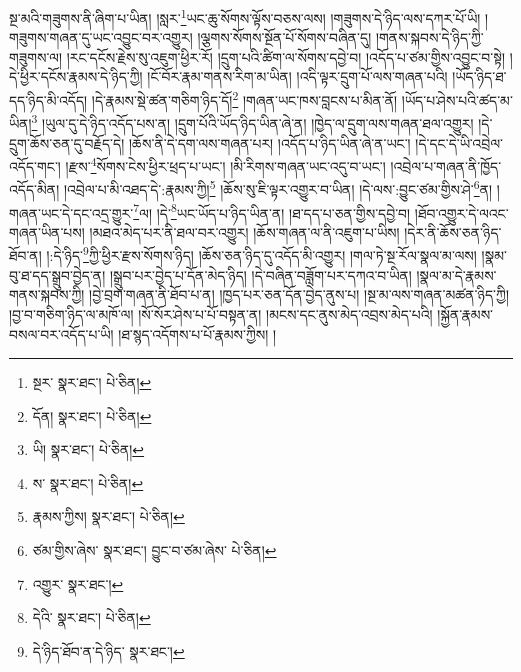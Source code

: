 སྔ་མའི་གཟུགས་ནི་ཞིག་པ་ཡིན། །སླར་\footnote{སྔར་  སྣར་ཐང་།  པེ་ཅིན། }ཡང་ཆུ་སོགས་ལྟོས་བཅས་ལས། །གཟུགས་དེ་ཉིད་ལས་དཀར་པོ་ཡི། །གཟུགས་གཞན་དུ་ཡང་འབྱུང་བར་འགྱུར། །ལྕགས་སོགས་སྔོན་པོ་སོགས་བཞིན་དུ། །གནས་སྐབས་དེ་ཉིད་ཀྱི་གཟུགས་ལ། །རང་དངོས་རྗེས་སུ་འཇུག་ཕྱིར་རོ། །དྲུག་པའི་ཚིག་ལ་སོགས་དབྱེ་བ། །འདོད་པ་ཙམ་གྱིས་འབྱུང་བ་སྟེ། །དེ་ཕྱིར་དངོས་རྣམས་དེ་ཉིད་ཀྱི། །ངོ་བོར་རྣམ་གནས་རིག་མ་ཡིན། །འདི་ལྟར་དྲུག་པོ་ལས་གཞན་པའི། །ཡོད་ཉིད་ཐ་དད་ཉིད་མི་འདོད། །དེ་རྣམས་སྡེ་ཚན་གཅིག་ཉིད་དོ།\footnote{དོན།  སྣར་ཐང་།  པེ་ཅིན། } །གཞན་ཡང་ཁས་བླངས་པ་མིན་ནོ། །ཡོད་པ་ཤེས་པའི་ཚད་མ་ཡིན།\footnote{ཡི།  སྣར་ཐང་།  པེ་ཅིན། } །ཡུལ་དུ་དེ་ཉིད་འདོད་པས་ན། །དྲུག་པོའི་ཡོད་ཉིད་ཡིན་ཞེ་ན། །ཁྱེད་ལ་དྲུག་ལས་གཞན་ཐལ་འགྱུར། །དེ་དྲུག་ཆོས་ཅན་དུ་བརྗོད་དེ། །ཆོས་ནི་དེ་དག་ལས་གཞན་པར། །འདོད་པ་ཉིད་ཡིན་ཞེ་ན་ཡང་། །དེ་དང་དེ་ཡི་འབྲེལ་འདོད་གང་། །རྫས་\footnote{ས་  སྣར་ཐང་།  པེ་ཅིན། }སོགས་ངེས་ཕྱིར་ཕྲད་པ་ཡང་། །མི་རིགས་གཞན་ཡང་འདུ་བ་ཡང་། །འབྲེལ་པ་གཞན་ནི་ཁྱོད་འདོད་མིན། །འབྲེལ་པ་མི་འཐད་དེ་:རྣམས་ཀྱི།\footnote{རྣམས་ཀྱིས།  སྣར་ཐང་།  པེ་ཅིན། } །ཆོས་སུ་ཇི་ལྟར་འགྱུར་བ་ཡིན། །དེ་ལས་:བྱུང་ཙམ་གྱིས་ཤེ་\footnote{ཙམ་གྱིས་ཞེས་  སྣར་ཐང་། བྱུང་བ་ཙམ་ཞེས་  པེ་ཅིན། }ན། །གཞན་ཡང་དེ་དང་འདྲ་གྱུར་\footnote{འགྱུར་  སྣར་ཐང་། }ལ། །དེ་\footnote{དེའི་  སྣར་ཐང་།  པེ་ཅིན། }ཡང་ཡོད་པ་ཉིད་ཡིན་ན། །ཐ་དད་པ་ཅན་གྱིས་དབྱེ་བ། །ཐོབ་འགྱུར་དེ་ལའང་གཞན་ཡིན་པས། །མཐའ་མེད་པར་ནི་ཐལ་བར་འགྱུར། །ཆོས་གཞན་ལ་ནི་འཇུག་པ་ཡིས། །དེར་ནི་ཆོས་ཅན་ཉིད་ཐོབ་ན། །:དེ་ཉིད་\footnote{དེ་ཉིད་ཐོབ་ན་དེ་ཉིད་  སྣར་ཐང་། }ཀྱི་ཕྱིར་རྫས་སོགས་ཉིད། །ཆོས་ཅན་ཉིད་དུ་འདོད་མི་འགྱུར། །གལ་ཏེ་སྔ་རོལ་སྣལ་མ་ལས། །སྣམ་བུ་ཐ་དད་སྒྲུབ་བྱེད་ན། །སྒྲུབ་པར་བྱེད་པ་དོན་མེད་ཉིད། །དེ་བཞིན་བཟློག་པར་དཀའ་བ་ཡིན། །སྣལ་མ་དེ་རྣམས་གནས་སྐབས་ཀྱི། །བྱེ་བྲག་གཞན་ནི་ཐོབ་པ་ན། །ཁྱད་པར་ཅན་དོན་བྱེད་ནུས་པ། །སྔ་མ་ལས་གཞན་མཚན་ཉིད་ཀྱི། །བྱ་བ་གཅིག་ཉིད་ལ་མཁོ་ལ། །སོ་སོར་ཤེས་པ་པོ་བསྟན་ན། །མངས་དང་ནུས་མེད་འབྲས་མེད་པའི། །སྐྱོན་རྣམས་བསལ་བར་འདོད་པ་ཡི། །ཐ་སྙད་འདོགས་པ་པོ་རྣམས་ཀྱིས། །
